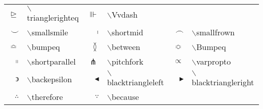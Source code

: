 \begin{table}
\begin{tabular}{rlrlrl}
$\trianglerighteq$&$\backslash$trianglerighteq&
$\Vvdash$&$\backslash$Vvdash\\
$\smallsmile$&$\backslash$smallsmile&
$\shortmid$&$\backslash$shortmid&
$\smallfrown$&$\backslash$smallfrown\\
$\bumpeq$&$\backslash$bumpeq&
$\between$&$\backslash$between&
$\Bumpeq$&$\backslash$Bumpeq\\
$\shortparallel$&$\backslash$shortparallel&
$\pitchfork$&$\backslash$pitchfork&
$\varpropto$&$\backslash$varpropto\\
$\backepsilon$&$\backslash$backepsilon&
$\blacktriangleleft$&$\backslash$blacktriangleleft&
$\blacktriangleright$&$\backslash$blacktriangleright\\
$\therefore$&$\backslash$therefore&
$\because$&$\backslash$because\\
\end{tabular}
\tablerule
\end{table}
 
